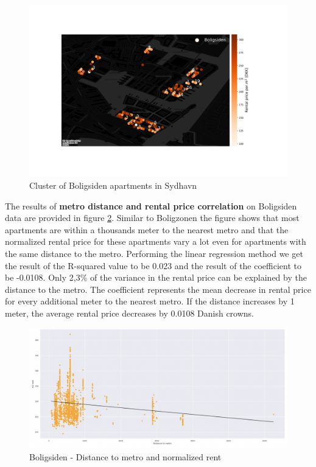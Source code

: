 \documentclass{article}
\begin{document}
\begin{figure}[!htbp]
    \centering
    \includegraphics[scale=0.4, trim={0 6cm 0 4cm},clip]{images/cluster_sydhavn.png}
    \caption{Cluster of Boligsiden apartments in Sydhavn}
    \label{fig:cluster_sydhavn}
\end{figure}


The results of \textbf{metro distance and rental price correlation} on Boligsiden data are provided in figure \ref{fig:dist_boligsiden}. Similar to Boligzonen the figure shows that most apartments are within a thousands meter to the nearest metro and that the normalized rental price for these apartments vary a lot even for apartments with the same distance to the metro. Performing the linear regression method we get the result of the R-squared value to be 0.023 and the result of the coefficient to be -0.0108. Only 2,3\% of the variance in the rental price can be explained by the distance to the metro. The coefficient represents the mean decrease in rental price for every additional meter to the nearest metro. If the distance increases by 1 meter, the average rental price decreases by 0.0108 Danish crowns.

\begin{figure}[!htbp]
    \centering
    \includegraphics[scale=0.35]{images/LinearReg_boligsiden.png}
    \caption{Boligsiden - Distance to metro and normalized rent}
    \label{fig:dist_boligsiden}
\end{figure}
\end{document}
